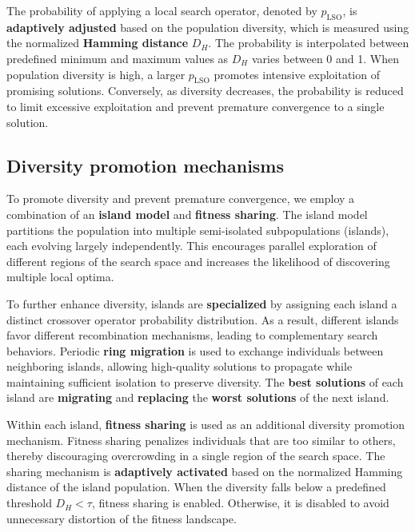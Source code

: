 \documentclass[a4paper,10pt]{article} %
\begin{document}
\noindent
The probability of applying a local search operator, denoted by $p_{\text{LSO}}$, is \textbf{adaptively adjusted} based on the population diversity, which is measured using the normalized \textbf{Hamming distance} $D_H$. The probability is interpolated between predefined minimum and maximum values as $D_H$ varies between 0 and 1. When population diversity is high, a larger $p_{\text{LSO}}$ promotes intensive exploitation of promising solutions. Conversely, as diversity decreases, the probability is reduced to limit excessive exploitation and prevent premature convergence to a single solution.

\subsection{Diversity promotion mechanisms}\label{sec_divprom}

To promote diversity and prevent premature convergence, we employ a combination of an \textbf{island model} and \textbf{fitness sharing}. The island model partitions the population into multiple semi-isolated subpopulations (islands), each evolving largely independently. This encourages parallel exploration of different regions of the search space and increases the likelihood of discovering multiple local optima.

\noindent
To further enhance diversity, islands are \textbf{specialized} by assigning each island a distinct crossover operator probability distribution. As a result, different islands favor different recombination mechanisms, leading to complementary search behaviors. Periodic \textbf{ring migration} is used to exchange individuals between neighboring islands, allowing high-quality solutions to propagate while maintaining sufficient isolation to preserve diversity. The \textbf{best solutions} of each island are \textbf{migrating} and \textbf{replacing} the \textbf{worst solutions} of the next island.

\noindent
Within each island, \textbf{fitness sharing} is used as an additional diversity promotion mechanism. Fitness sharing penalizes individuals that are too similar to others, thereby discouraging overcrowding in a single region of the search space. The sharing mechanism is \textbf{adaptively activated} based on the normalized Hamming distance of the island population. When the diversity falls below a predefined threshold $D_H < \tau$, fitness sharing is enabled. Otherwise, it is disabled to avoid unnecessary distortion of the fitness landscape.
\end{document}
